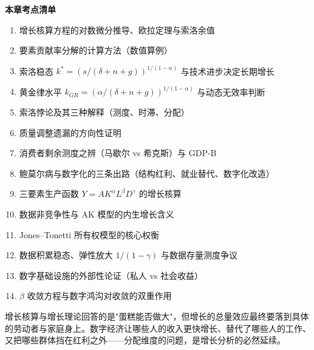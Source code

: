 \begin{chapterbox}
\textbf{本章考点清单}

\begin{enumerate}
\item 增长核算方程的对数微分推导、欧拉定理与索洛余值 
\item 要素贡献率分解的计算方法（数值算例）
\item 索洛稳态 $k^* = (s/(\delta+n+g))^{1/(1-\alpha)}$ 与技术进步决定长期增长 
\item 黄金律水平 $k_{GR} = (\alpha/(\delta+n+g))^{1/(1-\alpha)}$ 与动态无效率判断 
\item 索洛悖论及其三种解释（测度、时滞、分配）
\item 质量调整遗漏的方向性证明 
\item 消费者剩余测度之辨（马歇尔 vs 希克斯）与 GDP-B 
\item 鲍莫尔病与数字化的三条出路（结构红利、就业替代、数字化改造）
\item 三要素生产函数 $Y = AK^\alpha L^\beta D^\gamma$ 的增长核算 
\item 数据非竞争性与 AK 模型的内生增长含义 
\item Jones–Tonetti 所有权模型的核心权衡 
\item 数据积累稳态、弹性放大 $1/(1-\gamma)$ 与数据存量测度争议 
\item 数字基础设施的外部性论证（私人 vs 社会收益）
\item $\beta$ 收敛方程与数字鸿沟对收敛的双重作用 
\end{enumerate}
\end{chapterbox}

增长核算与增长理论回答的是"蛋糕能否做大"，但增长的总量效应最终要落到具体的劳动者与家庭身上。数字经济让哪些人的收入更快增长、替代了哪些人的工作、又把哪些群体挡在红利之外——分配维度的问题，是增长分析的必然延续。
